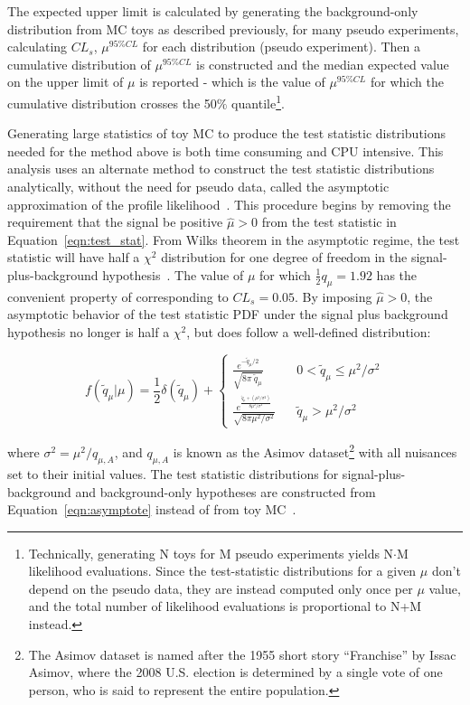 The expected upper limit is calculated by generating the background-only distribution from MC toys as described previously, for many pseudo experiments, calculating $CL_{s}$, $\mu^{95\% CL}$
for each distribution (pseudo experiment). Then a cumulative distribution of $\mu^{95\% CL}$ is constructed and the median expected value on the upper limit of $\mu$ is reported - which is the value
of $\mu^{95\% CL}$ for which the cumulative distribution crosses the 50$\%$ quantile\footnote{Technically, generating N toys for M pseudo experiments yields N$\cdot$M likelihood evaluations. Since the test-statistic
distributions for a given $\mu$ don't depend on the pseudo data, they are instead computed only once per $\mu$ value, and the total number of likelihood evaluations is proportional to N+M instead.}.

Generating large statistics of toy MC to produce the test statistic distributions needed for the method above is both time consuming and CPU intensive. This analysis uses an alternate method to
construct the test statistic distributions analytically, without the need for pseudo data, called the asymptotic approximation of the profile likelihood~\cite{AsymptoticLimits}.  
This procedure begins by removing the requirement that the signal be positive $\hat{\mu} > 0$ from the test statistic in Equation~\ref{eqn:test_stat}. From Wilks theorem
in the asymptotic regime, the test statistic will have half a $\chi^{2}$ distribution for one degree of freedom in the signal-plus-background hypothesis~\cite{wilks}. The value of $\mu$ for which
$\frac{1}{2}q_{\mu} = 1.92$ has the convenient property of corresponding to $CL_{s} = 0.05$. By imposing $\hat{\mu} > 0$, the asymptotic behavior of the test statistic PDF under the signal plus
background hypothesis no longer is half a $\chi^{2}$, but does follow a well-defined distribution:

\begin{equation}
\label{eqn:asymptote}
f(\tilde{q}_{\mu}|\mu) = \frac{1}{2}\delta(\tilde{q}_{\mu}) + \begin{cases}
  \frac{e^{-\tilde{q}_{\mu}/2}}{\sqrt{8\pi~\tilde{q}_{\mu}}} & ~~~~ 0 < \tilde{q}_{\mu} \leq \mu^{2}/\sigma^{2} \\
  \frac{e^{\frac{\tilde{q}_{\mu}+(\mu^{2}/\sigma^{2})}{8\mu^{2}/\sigma^{2}}}}{\sqrt{8\pi\mu^{2}/\sigma^{2}}} & ~~~~ \tilde{q}_{\mu} > \mu^{2}/\sigma^{2}
  \end{cases}
\end{equation}

\noindent where $\sigma^{2} = \mu^{2}/q_{\mu,A}$, and $q_{\mu,A}$ is known as the Asimov dataset\footnote{The Asimov dataset is named after the 1955 short story ``Franchise'' by Issac Asimov, where the 2008
U.S. election is determined by a single vote of one person, who is said to represent the entire population.} with all nuisances set to their initial values. The test statistic distributions for
signal-plus-background and background-only hypotheses are constructed from Equation~\ref{eqn:asymptote} instead of from toy MC~\cite{CMS-AN-11-298}. 

